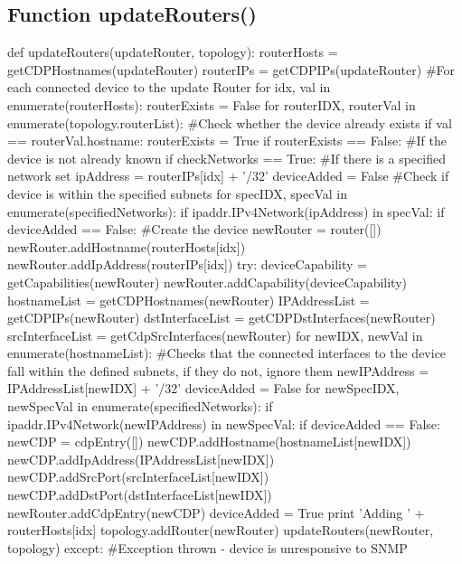 \documentclass[11pt]{report}
\begin{document}



\begin{appendices}
\chapter{Function updateRouters()}
\begin{python}
def updateRouters(updateRouter, topology):
	routerHosts = getCDPHostnames(updateRouter)
	routerIPs = getCDPIPs(updateRouter)
	#For each connected device to the update Router
	for idx, val in enumerate(routerHosts):
		routerExists = False
		for routerIDX, routerVal in enumerate(topology.routerList):
			#Check whether the device already exists
			if val == routerVal.hostname:
				routerExists = True
		if routerExists == False:
			#If the device is not already known
			if checkNetworks == True:
				#If there is a specified network set
				ipAddress = routerIPs[idx] + '/32'
				deviceAdded = False
				#Check if device is within the specified subnets
				for specIDX, specVal in enumerate(specifiedNetworks):
					if ipaddr.IPv4Network(ipAddress) in specVal:
						if deviceAdded == False:
							#Create the device
							newRouter = router([])
							newRouter.addHostname(routerHosts[idx])
							newRouter.addIpAddress(routerIPs[idx])
							try:
								deviceCapability = getCapabilities(newRouter)
								newRouter.addCapability(deviceCapability)
								hostnameList = getCDPHostnames(newRouter)
								IPAddressList = getCDPIPs(newRouter)
								dstInterfaceList = getCDPDstInterfaces(newRouter)
								srcInterfaceList = getCdpSrcInterfaces(newRouter)
								for newIDX, newVal in enumerate(hostnameList):
									#Checks that the connected interfaces to the device fall within the defined subnets, if they do not, ignore them
									newIPAddress = IPAddressList[newIDX] + '/32'
									deviceAdded = False
									for newSpecIDX, newSpecVal in enumerate(specifiedNetworks):
										if ipaddr.IPv4Network(newIPAddress) in newSpecVal:
											if deviceAdded == False:
												newCDP = cdpEntry([])
												newCDP.addHostname(hostnameList[newIDX])
												newCDP.addIpAddress(IPAddressList[newIDX])
												newCDP.addSrcPort(srcInterfaceList[newIDX])
												newCDP.addDstPort(dstInterfaceList[newIDX])
												newRouter.addCdpEntry(newCDP)
												deviceAdded = True
								print 'Adding ' + routerHosts[idx]
								topology.addRouter(newRouter)
								updateRouters(newRouter, topology)
							except:
								#Exception thrown - device is unresponsive to SNMP

\end{python}
\end{appendices}
\end{document}
